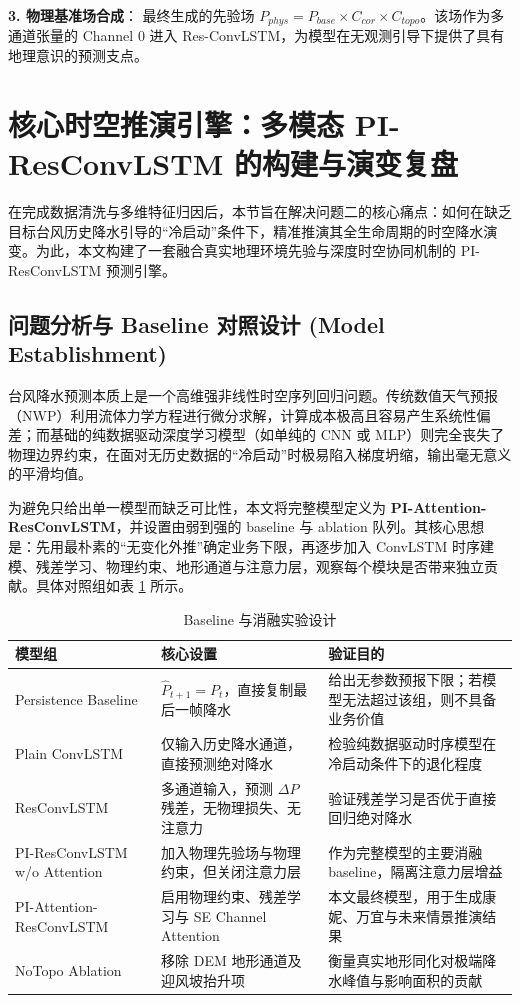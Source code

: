\documentclass[12pt,a4paper]{ctexart}
\begin{document}
\textbf{3. 物理基准场合成}：
最终生成的先验场 $P_{phys} = P_{base} \times C_{cor} \times C_{topo}$。该场作为多通道张量的 Channel 0 进入 Res-ConvLSTM，为模型在无观测引导下提供了具有地理意识的预测支点。


\newpage
\section{核心时空推演引擎：多模态 PI-ResConvLSTM 的构建与演变复盘}

在完成数据清洗与多维特征归因后，本节旨在解决问题二的核心痛点：如何在缺乏目标台风历史降水引导的“冷启动”条件下，精准推演其全生命周期的时空降水演变。为此，本文构建了一套融合真实地理环境先验与深度时空协同机制的 PI-ResConvLSTM 预测引擎。

\subsection{问题分析与 Baseline 对照设计 (Model Establishment)}
台风降水预测本质上是一个高维强非线性时空序列回归问题。传统数值天气预报（NWP）利用流体力学方程进行微分求解，计算成本极高且容易产生系统性偏差；而基础的纯数据驱动深度学习模型（如单纯的 CNN 或 MLP）则完全丧失了物理边界约束，在面对无历史数据的“冷启动”时极易陷入梯度坍缩，输出毫无意义的平滑均值。

为避免只给出单一模型而缺乏可比性，本文将完整模型定义为 \textbf{PI-Attention-ResConvLSTM}，并设置由弱到强的 baseline 与 ablation 队列。其核心思想是：先用最朴素的“无变化外推”确定业务下限，再逐步加入 ConvLSTM 时序建模、残差学习、物理约束、地形通道与注意力层，观察每个模块是否带来独立贡献。具体对照组如表 \ref{tab:baseline_design} 所示。

\begin{table}[H]
    \centering
    \small
    \caption{Baseline 与消融实验设计}
    \label{tab:baseline_design}
    \begin{tabular}{p{3.2cm}p{4.2cm}p{6.2cm}}
        \toprule
        \textbf{模型组} & \textbf{核心设置} & \textbf{验证目的} \\
        \midrule
        Persistence Baseline & $\hat{P}_{t+1}=P_t$，直接复制最后一帧降水 & 给出无参数预报下限；若模型无法超过该组，则不具备业务价值 \\
        Plain ConvLSTM & 仅输入历史降水通道，直接预测绝对降水 & 检验纯数据驱动时序模型在冷启动条件下的退化程度 \\
        ResConvLSTM & 多通道输入，预测 $\Delta P$ 残差，无物理损失、无注意力 & 验证残差学习是否优于直接回归绝对降水 \\
        PI-ResConvLSTM w/o Attention & 加入物理先验场与物理约束，但关闭注意力层 & 作为完整模型的主要消融 baseline，隔离注意力层增益 \\
        PI-Attention-ResConvLSTM & 启用物理约束、残差学习与 SE Channel Attention & 本文最终模型，用于生成康妮、万宜与未来情景推演结果 \\
        NoTopo Ablation & 移除 DEM 地形通道及迎风坡抬升项 & 衡量真实地形同化对极端降水峰值与影响面积的贡献 \\
        \bottomrule
    \end{tabular}
\end{table}
\end{document}
